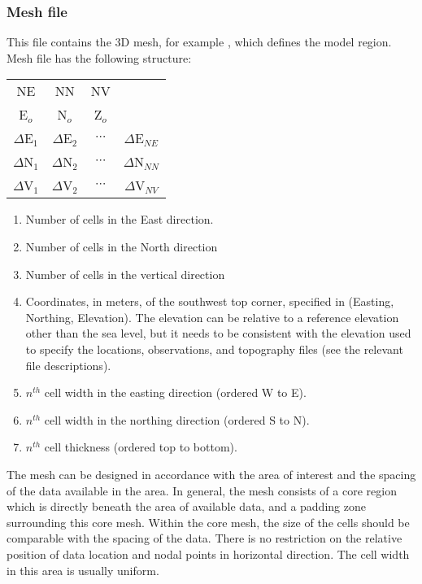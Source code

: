 \subsubsection{Mesh file}

This file contains the 3D mesh, for example , which defines the model region. Mesh file has the following structure:

\begin{fileExample}
\begin{tabular}{|cccc|}
\hline
NE & NN & NV & \\
E$_o$ & N$_o$ & Z$_o$ & \\
$\Delta$E$_1$ & $\Delta$E$_2$ & $\cdots$ & $\Delta$E$_{NE}$ \\
$\Delta$N$_1$ & $\Delta$N$_2$ & $\cdots$ & $\Delta$N$_{NN}$ \\
$\Delta$V$_1$ & $\Delta$V$_2$ & $\cdots$ & $\Delta$V$_{NV}$ \\
\hline
\end{tabular}
\end{fileExample}
%
\begin{enumerate}
\item[\codeName{NE}] Number of cells in the East direction.
\item[\codeName{NN}] Number of cells in the North direction
\item[\codeName{NV}] Number of cells in the vertical direction
\item[\codeName{E$_o$ N$_o$ V$_o$}] Coordinates, in meters, of the southwest top corner, specified in (Easting, Northing, Elevation). The elevation can be relative to a reference elevation other than the sea level, but it needs to be consistent with the elevation used to specify the locations, observations, and topography files (see the relevant file descriptions).
\item[\codeName{$\Delta$E$_n$}] $n^{th}$ cell width in the easting direction (ordered W to E).
\item[\codeName{$\Delta$N$_n$}] $n^{th}$ cell width in the northing direction (ordered S to N).
\item[\codeName{$\Delta$V$_n$}] $n^{th}$ cell thickness (ordered top to bottom).
\end{enumerate}

The mesh can be designed in accordance with the area of interest and the spacing of the data available in the area. In general, the mesh consists of a core region which is directly beneath the area of available data, and a padding zone surrounding this core mesh. Within the core mesh, the size of the cells should be comparable with the spacing of the data. There is no restriction on the relative position of data location and nodal points in horizontal direction. The cell width in this area is usually uniform.

